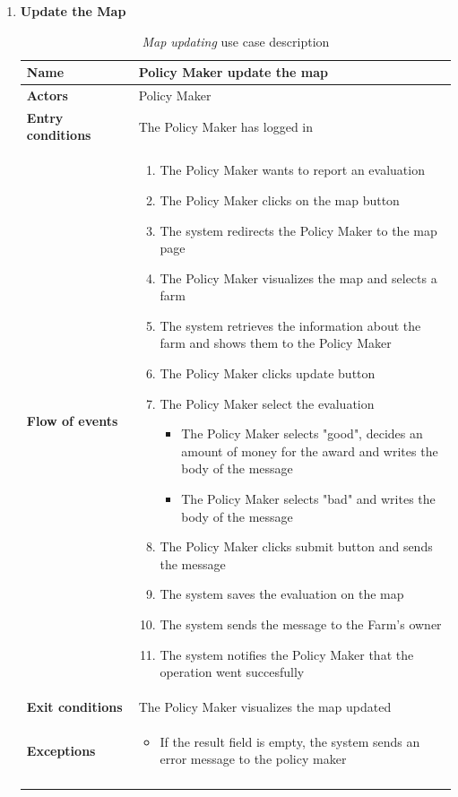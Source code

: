\begin{enumerate}
    \item \textbf{Update the Map}
    \begin{longtable}{p{0.26\linewidth}p{0.75\linewidth}}
        \toprule
        \textbf{Name} & \textbf{Policy Maker update the map} \\
        \midrule
        \textbf{Actors} & Policy Maker \\
        \midrule
        \textbf{Entry conditions} & The Policy Maker has logged in\\
        \midrule
        \textbf{Flow of events} & 
        \begin{enumerate}
            \item The Policy Maker wants to report an evaluation
            \item The Policy Maker clicks on the map button
            \item The system redirects the Policy Maker to the map page
            \item The Policy Maker visualizes the map and selects a farm
            \item The system retrieves the information about the farm and shows them to the Policy Maker
            \item The Policy Maker clicks update button
            \item The Policy Maker select the evaluation
                \begin{itemize}
                    \item The Policy Maker selects "good", decides an amount of money for the award and writes the body of the message
                    \item The Policy Maker selects "bad" and writes the body of the message
                \end{itemize}
            \item The Policy Maker clicks submit button and sends the message
            \item The system saves the evaluation on the map
            \item The system sends the message to the Farm's owner
            \item The system notifies the Policy Maker that the operation went succesfully 
        \end{enumerate} \\
        \midrule
        \textbf{Exit conditions} & The Policy Maker visualizes the map updated\\
        \midrule
        \textbf{Exceptions} & 
        \begin{itemize}
            \item If the result field is empty, the system sends an error message to the policy maker 
        \end{itemize}\\
        \bottomrule
        \caption{\emph{Map updating} use case description}
    \end{longtable}


\end{enumerate}
